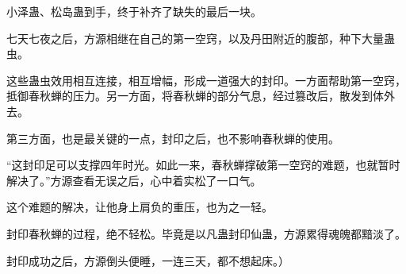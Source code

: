 \begin{this_body}
小泽蛊、松岛蛊到手，终于补齐了缺失的最后一块。

七天七夜之后，方源相继在自己的第一空窍，以及丹田附近的腹部，种下大量蛊虫。

这些蛊虫效用相互连接，相互增幅，形成一道强大的封印。一方面帮助第一空窍，抵御春秋蝉的压力。另一方面，将春秋蝉的部分气息，经过篡改后，散发到体外去。

第三方面，也是最关键的一点，封印之后，也不影响春秋蝉的使用。

“这封印足可以支撑四年时光。如此一来，春秋蝉撑破第一空窍的难题，也就暂时解决了。”方源查看无误之后，心中着实松了一口气。

这个难题的解决，让他身上肩负的重压，也为之一轻。

封印春秋蝉的过程，绝不轻松。毕竟是以凡蛊封印仙蛊，方源累得魂魄都黯淡了。

封印成功之后，方源倒头便睡，一连三天，都不想起床。）

\end{this_body}

